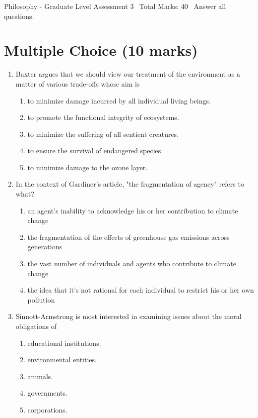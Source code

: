 \documentclass[12pt]{article}
\begin{document}
\begin{center}
Philosophy - Graduate Level Assessment 3 \
Total Marks: 40 \
Answer all questions.
\end{center}

\section*{Multiple Choice (10 marks)}
\begin{enumerate}[label=\arabic*.]
\item Baxter argues that we should view our treatment of the environment as a matter of various
trade-offs whose aim is
\begin{enumerate}[label=(\alph*)]
    \item to minimize damage incurred by all individual living beings.
    \item to promote the functional integrity of ecosystems.
    \item to minimize the suffering of all sentient creatures.
    \item to ensure the survival of endangered species.
    \item to minimize damage to the ozone layer.
\end{enumerate}
\item In the context of Gardiner's article, "the fragmentation of agency" refers to what?
\begin{enumerate}[label=(\alph*)]
    \item an agent's inability to acknowledge his or her contribution to climate change
    \item the fragmentation of the effects of greenhouse gas emissions across generations
    \item the vast number of individuals and agents who contribute to climate change
    \item the idea that it's not rational for each individual to restrict his or her own pollution
\end{enumerate}
\item Sinnott-Armstrong is most interested in examining issues about the moral obligations of
\begin{enumerate}[label=(\alph*)]
    \item educational institutions.
    \item environmental entities.
    \item animals.
    \item governments.
    \item corporations.

\end{enumerate}
\end{enumerate}
\end{document}
